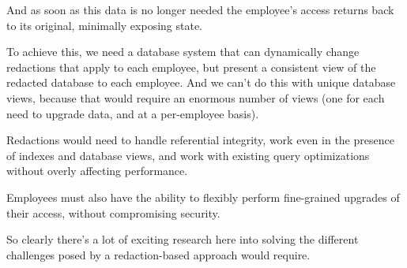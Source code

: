 And as soon as this data is no longer needed the employee’s access returns back to its original, minimally exposing state.

To achieve this, we need a database system that can dynamically change redactions that apply to each employee, but present a consistent view of the redacted database to each employee.
And we can’t do this with unique database views, because that would require an enormous number of views (one for each need to upgrade data, and at a per-employee basis).

Redactions would need to handle referential integrity, work even in the presence of indexes and database views, and work with existing query optimizations without overly affecting performance.

Employees must also have the ability to flexibly perform fine-grained upgrades of their access, without compromising security.

So clearly there’s a lot of exciting research here into solving the different challenges posed by a redaction-based approach would require.


